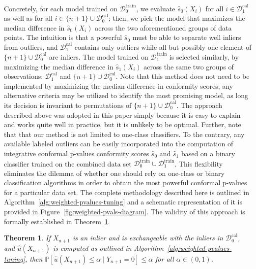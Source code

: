 \documentclass[11pt]{article}
\newtheorem{theorem}{Theorem}
\renewcommand{\P}[1]{\mathbb{P}\left[#1\right]}
\begin{document}
Concretely, for each model trained on $\mathcal{D}_0^{\mathrm{train}}$, we evaluate $\hat{s}_0(X_i)$ for all $i \in \mathcal{D}_{1}^{\mathrm{cal}}$ as well as for all  $i \in \{n+1\} \cup \mathcal{D}_{0}^{\mathrm{cal}}$; then, we pick the model that maximizes the median difference in $\hat{s}_0(X_i)$ across the two aforementioned groups of data points.
The intuition is that a powerful $\hat{s}_0$ must be able to separate well inliers from outliers, and $\mathcal{D}_{1}^{\mathrm{cal}}$ contains only outliers while all but possibly one element of $\{n+1\} \cup \mathcal{D}_{0}^{\mathrm{cal}}$ are inliers.
The model trained on $\mathcal{D}_1^{\mathrm{train}}$ is selected similarly, by maximizing the median difference in $\hat{s}_1(X_i)$ across the same two groups of observations: $\mathcal{D}_{1}^{\mathrm{cal}}$ and $\{n+1\} \cup \mathcal{D}_{0}^{\mathrm{cal}}$.
Note that this method does not need to be implemented by maximizing the median difference in conformity scores; any alternative criteria may be utilized to identify the most promising model, as long its decision is invariant to permutations of $\{n+1\} \cup \mathcal{D}_{0}^{\mathrm{cal}}$.
The approach described above was adopted in this paper simply because it is easy to explain and works quite well in practice, but it is unlikely to be optimal.
Further, note that that our method is not limited to one-class classifiers.
To the contrary, any available labeled outliers can be easily incorporated into the computation of integrative conformal p-values conformity scores $\hat{s}_0$ and $\hat{s}_1$ based on a binary classifier trained on the combined data set $\mathcal{D}_0^{\mathrm{train}} \cup \mathcal{D}_1^{\mathrm{train}}$.
This flexibility eliminates the dilemma of whether one should rely on one-class or binary classification algorithms in order to obtain the most powerful conformal p-values for a particular data set.
The complete methodology described here is outlined in Algorithm~\ref{alg:weighted-pvalues-tuning} and a schematic representation of it is provided in Figure~\ref{fig:weighted-pvals-diagram}.
The validity of this approach is formally established in Theorem~\ref{theorem:ratio-exchangeable-tuning}.

\begin{theorem} \label{theorem:ratio-exchangeable-tuning}
  If $X_{n+1}$ is an inlier and is exchangeable with the inliers in $\mathcal{D}_0^{\mathrm{cal}}$, and $\hat{u}(X_{n+1})$ is computed as outlined in Algorithm~\ref{alg:weighted-pvalues-tuning}, then $\P{\hat{u}(X_{n+1}) \leq \alpha \mid Y_{n+1} = 0} \leq \alpha$ for all $\alpha \in (0,1)$.
\end{theorem}
\end{document}
